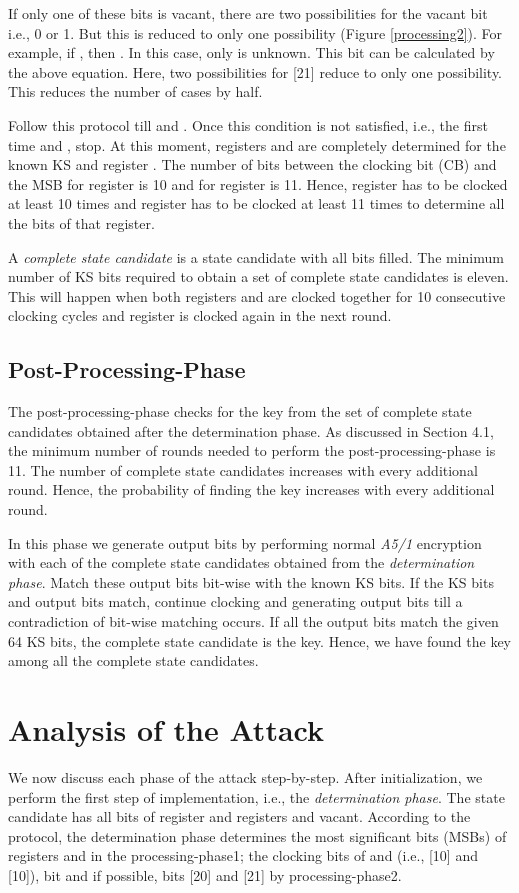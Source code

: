 \documentclass{llncs}
\begin{document}
If only one of these bits is vacant, there are two possibilities for the vacant bit i.e., 0 or 1. But this is reduced to only one possibility (Figure \ref{processing2}). For example, if ,  then . In this case, only  is unknown. This bit can be calculated by the above equation. Here, two possibilities for [21] reduce to only one possibility. This reduces the number of cases by half.

Follow this protocol till  and . Once this condition is not satisfied, i.e., the first time  and , stop. At this moment, registers  and  are completely determined for the known KS and register . The number of bits between the clocking bit (CB) and the MSB for register  is 10 and for register  is 11. Hence, register  has to be clocked at least 10 times and register  has to be clocked at least 11 times to determine all the bits of that register.

A \emph{complete state candidate} is a state candidate with all bits filled. The minimum number of KS bits required to obtain a set of complete state candidates is eleven. This will happen when both registers  and  are clocked together for 10 consecutive clocking cycles and register  is clocked again in the next round.


\subsection{Post-Processing-Phase}
The post-processing-phase checks for the key from the set of complete state candidates obtained after the determination phase. As discussed in Section 4.1, the minimum number of rounds needed to perform the post-processing-phase is 11. The number of complete state candidates increases with every additional round. Hence, the probability of finding the key increases with every additional round.

In this phase we generate output bits by performing normal \emph{A5/1} encryption with each of the complete state candidates obtained from the \emph{determination phase}. Match these output bits bit-wise with the known KS bits. If the KS bits and output bits match, continue clocking and generating output bits till a contradiction of bit-wise matching occurs. If all the output bits match the given 64 KS bits, the complete state candidate is the key. Hence, we have found the key among all the complete state candidates.

\section{Analysis of the Attack}
We now discuss each phase of the attack step-by-step. After initialization, we perform the first step of implementation, i.e., the \emph{determination phase}. The state candidate has all bits of register  and registers  and  vacant. According to the protocol, the determination phase determines the most significant bits (MSBs) of registers  and  in the processing-phase1; the clocking bits of  and  (i.e., [10] and [10]), bit  and if possible, bits [20] and [21] by processing-phase2. 
\end{document}
